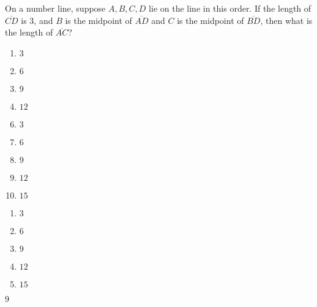 











  On a number line, suppose $A,B,C,D$ lie on the line in this order. If the length of $\overline{CD}$ is 3, and $B$ is the midpoint of $\overline{AD}$ and $C$ is the midpoint of $\overline{BD}$, then what is the length of  $\overline{AC}$?


\ifsat
	\begin{enumerate}[label=\Alph*)]
		\item  $3$
		\item  $6$
		\item $9$%
		\item   $12$
	\end{enumerate}
\else
\fi

\ifacteven
	\begin{enumerate}[label=\textbf{\Alph*.},itemsep=\fill,align=left]
		\setcounter{enumii}{5}
		\item  $3$
		\item  $6$
		\item $9$%
		\addtocounter{enumii}{1}
		\item   $12$
		\item $15$
	\end{enumerate}
\else
\fi

\ifactodd
	\begin{enumerate}[label=\textbf{\Alph*.},itemsep=\fill,align=left]
		\item  $3$
		\item  $6$
		\item $9$%
		\item   $12$
		\item $15$
	\end{enumerate}
\else
\fi

\ifgridin
 $9$%
		
\else
\fi

